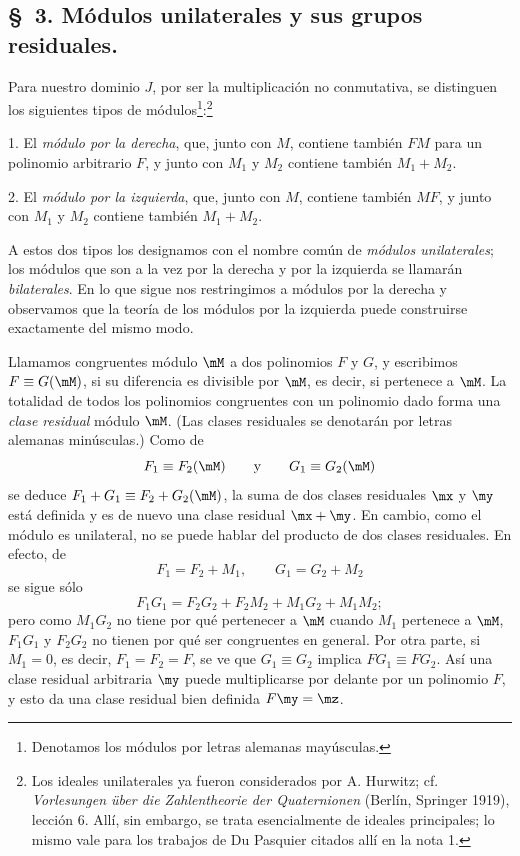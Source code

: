 \documentclass[11pt]{article}
\begin{document}
\subsection*{\S~3. Módulos unilaterales y sus grupos residuales.}

Para nuestro dominio $J$, por ser la multiplicación no conmutativa, se distinguen los siguientes tipos de módulos\footnote{Denotamos los módulos por letras alemanas mayúsculas.}:\footnote{Los ideales unilaterales ya fueron considerados por A. Hurwitz; cf. \emph{Vorlesungen über die Zahlentheorie der Quaternionen} (Berlín, Springer 1919), lección 6. Allí, sin embargo, se trata esencialmente de ideales principales; lo mismo vale para los trabajos de Du Pasquier citados allí en la nota 1.}

1. El \emph{módulo por la derecha}, que, junto con $M$, contiene también $FM$ para un polinomio arbitrario $F$, y junto con $M_1$ y $M_2$ contiene también $M_1+M_2$.

2. El \emph{módulo por la izquierda}, que, junto con $M$, contiene también $MF$, y junto con $M_1$ y $M_2$ contiene también $M_1+M_2$.

A estos dos tipos los designamos con el nombre común de \emph{módulos unilaterales}; los módulos que son a la vez por la derecha y por la izquierda se llamarán \emph{bilaterales}. En lo que sigue nos restringimos a módulos por la derecha y observamos que la teoría de los módulos por la izquierda puede construirse exactamente del mismo modo.

Llamamos congruentes módulo $\mM$ a dos polinomios $F$ y $G$, y escribimos $F\equiv G(\mM)$, si su diferencia es divisible por $\mM$, es decir, si pertenece a $\mM$. La totalidad de todos los polinomios congruentes con un polinomio dado forma una \emph{clase residual} módulo $\mM$. (Las clases residuales se denotarán por letras alemanas minúsculas.) Como de
\[
 F_1\equiv F_2(\mM)\qquad\text{y}\qquad G_1\equiv G_2(\mM)
\]
se deduce $F_1+G_1\equiv F_2+G_2(\mM)$, la suma de dos clases residuales $\mx$ y $\my$ está definida y es de nuevo una clase residual $\mx+\my$. En cambio, como el módulo es unilateral, no se puede hablar del producto de dos clases residuales. En efecto, de
\[
 F_1=F_2+M_1,\qquad G_1=G_2+M_2
\]
se sigue sólo
\[
 F_1G_1=F_2G_2+F_2M_2+M_1G_2+M_1M_2;
\]
pero como $M_1G_2$ no tiene por qué pertenecer a $\mM$ cuando $M_1$ pertenece a $\mM$, $F_1G_1$ y $F_2G_2$ no tienen por qué ser congruentes en general. Por otra parte, si $M_1=0$, es decir, $F_1=F_2=F$, se ve que $G_1\equiv G_2$ implica $FG_1\equiv FG_2$. Así una clase residual arbitraria $\my$ puede multiplicarse por delante por un polinomio $F$, y esto da una clase residual bien definida $F\my=\mz$.
\end{document}
